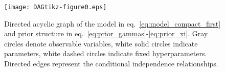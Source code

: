 \documentclass[12pt,a4paper]{article}
\theoremstyle{custom}
\begin{document}

\begin{figure}[t]
\centering
\texttt{[image: DAGtikz-figure0.eps]}
\caption{Directed acyclic graph of the model in eq.~\eqref{eq:model_compact_first} and prior structure in eq.~\eqref{eq:prior_gammas}-\eqref{eq:prior_xi}. Gray circles denote observable variables, white solid circles indicate parameters, white dashed circles indicate fixed hyperparameters. Directed edges represent the conditional independence relationships.}
\label{fig:prior}
\end{figure}
\end{document}
